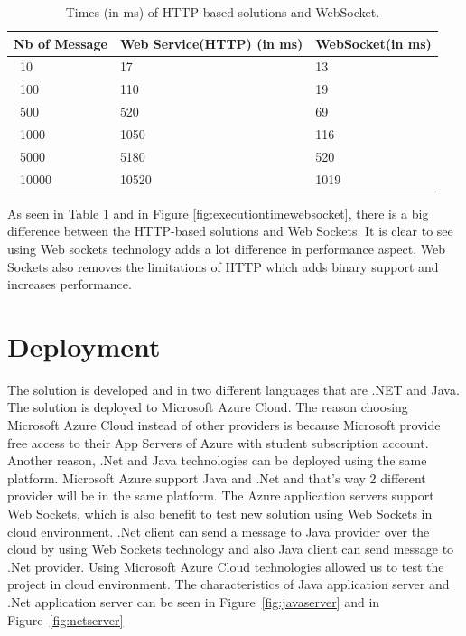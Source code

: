 \begin{table}
\centering
\begin{tabular}{ p{5.50cm}p{5.50cm} p{5.50cm} }
\toprule
\multicolumn{1}{l}{\textbf{Nb of Message}} & \textbf{Web Service(HTTP) (in ms)} & \textbf{WebSocket(in ms)}\\
\midrule
\ 10    & 17    & 13\\
\ 100   & 110   & 19\\
\ 500   & 520   & 69\\
\ 1000  & 1050  & 116\\
\ 5000  & 5180  & 520\\
\ 10000 & 10520 & 1019\\

\bottomrule
\end{tabular}
\caption[Avarage Times(in ms) of HTTP-based solutions and WebSocket.]{Times (in ms) of HTTP-based solutions and WebSocket.}
\label{tab:websov}
\end{table}

As seen in Table \ref{tab:websov} and in Figure \ref{fig:executiontimewebsocket}, there is a big difference between the HTTP-based solutions and Web Sockets. It is clear to see using Web sockets technology adds a lot difference in performance aspect. Web Sockets also removes the limitations of HTTP which adds binary support and increases performance.


\section{Deployment}
\label{section:deployment}

The solution is developed and in two different languages that are .NET and Java. The solution is deployed to Microsoft Azure Cloud. The reason choosing Microsoft Azure Cloud instead of other providers is because Microsoft provide free access to their App Servers of Azure with student subscription account. Another reason, .Net and Java technologies can be deployed using the same platform. Microsoft Azure support Java and .Net and that's way 2 different provider will be in the same platform. The Azure application servers support Web Sockets, which is also benefit to test new solution using Web Sockets in cloud environment. .Net client can send a message to Java provider over the cloud by using Web Sockets technology and also Java client can send message to .Net provider. Using Microsoft Azure Cloud technologies allowed us to test the project in cloud environment. The characteristics of Java application server and .Net application server can be seen in Figure~\ref{fig:javaserver} and in Figure~\ref{fig:netserver}

